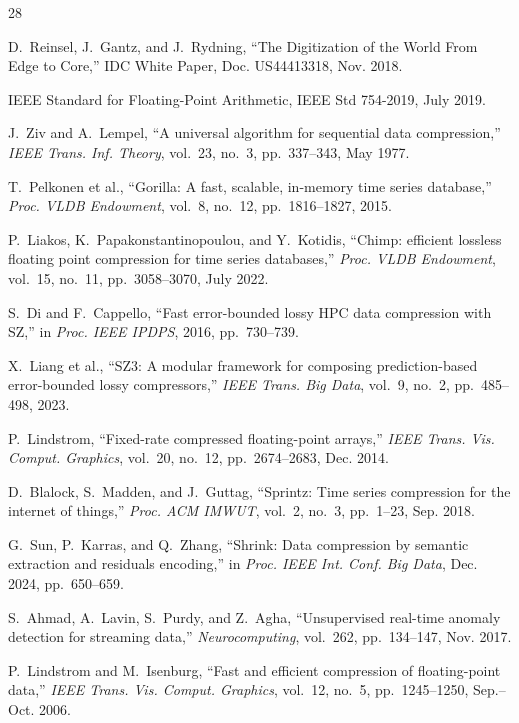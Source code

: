 \documentclass[runningheads]{llncs}
\begin{document}
\begin{thebibliography}{28}

D.~Reinsel, J.~Gantz, and J.~Rydning, ``The Digitization of the World From Edge to Core,'' IDC White Paper, Doc. US44413318, Nov. 2018.

IEEE Standard for Floating-Point Arithmetic, IEEE Std 754-2019, July 2019.

J.~Ziv and A.~Lempel, ``A universal algorithm for sequential data compression,'' \emph{IEEE Trans. Inf. Theory}, vol.~23, no.~3, pp.~337--343, May 1977.

T.~Pelkonen et al., ``Gorilla: A fast, scalable, in-memory time series database,'' \emph{Proc. VLDB Endowment}, vol.~8, no.~12, pp.~1816--1827, 2015.

P.~Liakos, K.~Papakonstantinopoulou, and Y.~Kotidis, ``Chimp: efficient lossless floating point compression for time series databases,'' \emph{Proc. VLDB Endowment}, vol.~15, no.~11, pp.~3058--3070, July 2022.

S.~Di and F.~Cappello, ``Fast error-bounded lossy HPC data compression with SZ,'' in \emph{Proc. IEEE IPDPS}, 2016, pp.~730--739.

X.~Liang et al., ``SZ3: A modular framework for composing prediction-based error-bounded lossy compressors,'' \emph{IEEE Trans. Big Data}, vol.~9, no.~2, pp.~485--498, 2023.

P.~Lindstrom, ``Fixed-rate compressed floating-point arrays,'' \emph{IEEE Trans. Vis. Comput. Graphics}, vol.~20, no.~12, pp.~2674--2683, Dec. 2014.

D.~Blalock, S.~Madden, and J.~Guttag, ``Sprintz: Time series compression for the internet of things,'' \emph{Proc. ACM IMWUT}, vol.~2, no.~3, pp.~1--23, Sep. 2018.

G.~Sun, P.~Karras, and Q.~Zhang, ``Shrink: Data compression by semantic extraction and residuals encoding,'' in \emph{Proc. IEEE Int. Conf. Big Data}, Dec. 2024, pp.~650--659.

S.~Ahmad, A.~Lavin, S.~Purdy, and Z.~Agha, ``Unsupervised real-time anomaly detection for streaming data,'' \emph{Neurocomputing}, vol.~262, pp.~134--147, Nov. 2017.

P.~Lindstrom and M.~Isenburg, ``Fast and efficient compression of floating-point data,'' \emph{IEEE Trans. Vis. Comput. Graphics}, vol.~12, no.~5, pp.~1245--1250, Sep.--Oct. 2006.


\end{thebibliography}
\end{document}
